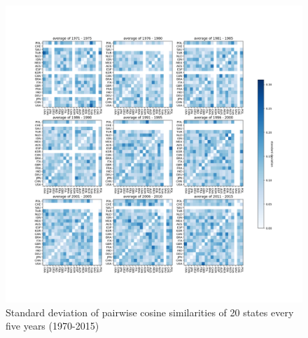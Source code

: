 \documentclass[final,authoryear,3p,12pt,times,hidelinks]{elsarticle}
\begin{document}
\begin{figure}[ht!]
  \begin{center}
    \includegraphics[trim=75 75 75 75, width=\textwidth]{graphs/doc2vec_consine_similarity_average_dynamics_std.png}
    \caption{Standard deviation of pairwise cosine similarities of 20 states every five years (1970-2015)}
    \label{fig:doc2vec consine average dynamics std}
  \end{center}
\end{figure}
\end{document}
